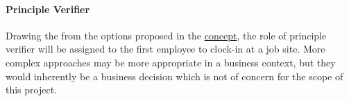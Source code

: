 \paragraph{Principle Verifier}
Drawing the from the options proposed in the
\hyperref[s:concept]{concept}, the role of principle
verifier will be assigned to the first employee to
\gls{clock-in} at a job site.
More complex approaches may be more appropriate in a
business context, but they would inherently be a business
decision which is not of concern for the scope of this
project.

